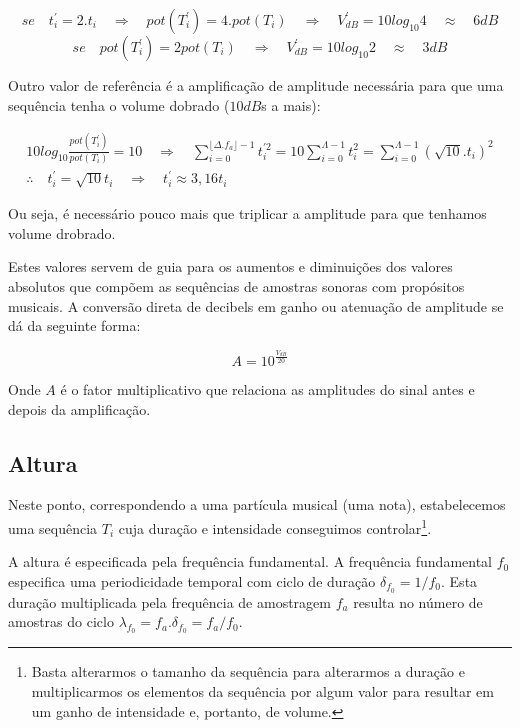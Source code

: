 \begin{equation*}
se \quad  t_i^{'}=2 . t_i \quad \Rightarrow \quad pot(T^{'}_i)=4 . pot(T_i) \quad \Rightarrow \quad V^{'}_{dB}=10log_{10} 4 \quad  \approx \quad 6 dB
\end{equation*}
\begin{equation*}
se \quad pot(T^{'}_i)=2 pot(T_i) \quad \Rightarrow \quad V^{'}_{dB}=10log_{10} 2 \quad \approx \quad 3 dB
\end{equation*}

Outro valor de referência é a amplificação de amplitude
necessária para que uma sequência tenha o volume dobrado ($10dB$s a mais):

\begin{gather}
10log_{10}\frac{pot(T^{'}_i)}{pot(T_i)} = 10 \quad \Rightarrow \quad \sum_{i=0}^{\lfloor \Delta.f_a \rfloor -1}t^{'2}_i=10\sum_{i=0}^{\Lambda-1}t_i^2=\sum_{i=0}^{\Lambda-1}(\sqrt{10}.t_i)^2 \\
\therefore \quad t^{'}_i=\sqrt{10}t_i \quad \Rightarrow \quad t^{'}_i \approx 3,16t_i
\end{gather}

Ou seja, é necessário pouco mais que triplicar a amplitude para que tenhamos volume drobrado.

Estes valores servem de guia para os aumentos e diminuições dos valores absolutos que compõem as
sequências de amostras sonoras com propósitos musicais. A conversão direta de decibels
em ganho ou atenuação de amplitude se dá da seguinte forma:

\begin{equation}\label{ampDec}
A = 10^{\frac{V_{dB}}{20}}
\end{equation}

Onde $A$ é o fator multiplicativo que relaciona as amplitudes do sinal antes e depois da amplificação.

\subsection{Altura}

Neste ponto, correspondendo a uma partícula musical (uma nota), estabelecemos uma sequência $T_i$ cuja
duração e intensidade conseguimos controlar\footnote{Basta alterarmos o tamanho da sequência para alterarmos
a duração e multiplicarmos os elementos da sequência por algum valor para resultar em um ganho de intensidade e, portanto, de volume.}. 


A altura é especificada pela frequência fundamental. A frequência fundamental $f_0$ especifica uma periodicidade temporal
com ciclo de duração $\delta_{f_0} = 1/f_0$. Esta duração multiplicada pela frequência de amostragem $f_a$ resulta no número de amostras
do ciclo $\lambda_{f_0}=f_a . \delta_{f_0} =f_a/f_0$.

